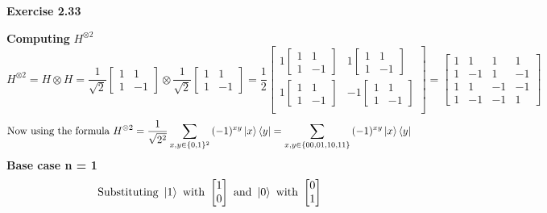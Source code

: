 \documentclass{article}
\begin{document}
\begin{framed}
    \noindent \textbf{Exercise 2.33}
    
    \medskip

    \textbf{Computing} $H^{\otimes 2}$
    $$
    H^{\otimes 2} = H \otimes H = \frac{1}{\sqrt{2}}\begin{bmatrix}1 & 1 \\ 1 & -1\end{bmatrix} \otimes \frac{1}{\sqrt{2}}\begin{bmatrix}1 & 1 \\ 1 & -1\end{bmatrix} = \frac{1}{2}
    \begin{bmatrix}
    1 \begin{bmatrix}1 & 1 \\ 1 & -1\end{bmatrix} &
    1 \begin{bmatrix}1 & 1 \\ 1 & -1\end{bmatrix} \\
    1 \begin{bmatrix}1 & 1 \\ 1 & -1\end{bmatrix} & 
    -1 \begin{bmatrix}1 & 1 \\ 1 & -1\end{bmatrix} \\
    \end{bmatrix} =
    \begin{bmatrix}
        1 & 1 & 1 & 1 \\
        1 & -1 & 1 & -1 \\
        1 & 1 & -1 & -1 \\
        1 & -1 & -1 & 1
    \end{bmatrix}
    $$
    $$
    \text{Now using the formula } H^{\otimes 2} = \frac{1}{\sqrt{2^2}} \sum_{x,y \in \{0, 1\}^2}{(-1)^{xy}\ket{x}\bra{y}} = \sum_{x,y \in \{00, 01, 10, 11 \}}{(-1)^{xy}\ket{x}\bra{y}}
    $$
    \textbf{Base case n = 1}
    $$
    \text{Substituting } \ket{1} \text{ with } \begin{bmatrix}1 \\ 0\end{bmatrix} \text{ and } \ket{0} \text{ with } \begin{bmatrix}0 \\ 1\end{bmatrix} $$

\end{framed}
\end{document}
